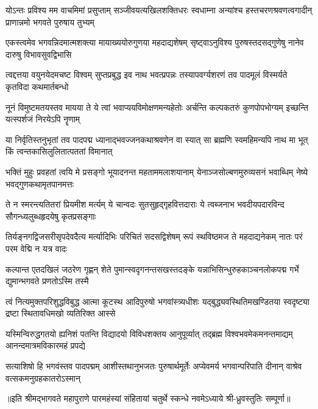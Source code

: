
\fourlineindentedshloka
{योऽन्तः प्रविश्य मम वाचमिमां प्रसुप्ताम्}
{सञ्जीवयत्यखिलशक्तिधरः स्वधाम्ना}
{अन्यांश्च हस्तचरणश्रवणत्वगादीन्}
{प्राणान्नमो भगवते पुरुषाय तुभ्यम्}

\fourlineindentedshloka
{एकस्त्वमेव भगवन्निदमात्मशक्त्या}
{मायाख्ययोरुगुणया महदाद्यशेषम्}
{सृष्ट्वाऽनुविश्य पुरुषस्तदसद्गुणेषु}
{नानेव दारुषु विभावसुवद्विभासि}

\fourlineindentedshloka
{त्वद्दत्तया वयुनयेदमचष्ट विश्वम्}
{सुप्तप्रबुद्ध इव नाथ भवत्प्रपन्नः}
{तस्यापवर्ग्यशरणं तव पादमूलं}
{विस्मर्यते कृतविदा कथमार्तबन्धो}

\fourlineindentedshloka
{नूनं विमुष्टमतयस्तव मायया ते}
{ये त्वां भवाप्ययविमोक्षणमन्यहेतोः}
{अर्चन्ति कल्पकतरुं कुणपोपभोग्यम्}
{इच्छन्ति यत्स्पर्शजं निरयेऽपि नॄणाम्}

\fourlineindentedshloka
{या निर्वृतिस्तनुभृतां तव पादपद्म}
{ध्यानाद्भवज्जनकथाश्रवणेन वा स्यात्}
{सा ब्रह्मणि स्वमहिमन्यपि नाथ मा भूत्}
{किं त्वन्तकासिलुलितात्पततां विमानात्}

\fourlineindentedshloka
{भक्तिं मुहुः प्रवहतां त्वयि मे प्रसङ्गो}
{भूयादनन्त महताममलाशयानाम्}
{येनाञ्जसोल्बणमुरुव्यसनं भवाब्धिम्}
{नेष्ये भवद्गुणकथामृतपानमत्तः}

\fourlineindentedshloka
{ते न स्मरन्त्यतितरां प्रियमीश मर्त्यम्}
{ये चान्वदः सुतसुहृद्गृहवित्तदाराः}
{ये त्वब्जनाभ भवदीयपदारविन्द}
{सौगन्ध्यलुब्धहृदयेषु कृतप्रसङ्गाः}

\fourlineindentedshloka
{तिर्यङ्नगद्विजसरीसृपदेवदैत्य}
{मर्त्यादिभिः परिचितं सदसद्विशेषम्}
{रूपं स्थविष्ठमज ते महदाद्यनेकम्}
{नातः परं परम वेद्मि न यत्र वादः}

\fourlineindentedshloka
{कल्पान्त एतदखिलं जठरेण गृह्णन्}
{शेते पुमान्स्वदृगनन्तसखस्तदङ्के}
{यन्नाभिसिन्धुरुहकाञ्चनलोकपद्म}
{गर्भे द्युमान्भगवते प्रणतोऽस्मि तस्मै}

\fourlineindentedshloka
{त्वं नित्यमुक्तपरिशुद्धविबुद्ध आत्मा}
{कूटस्थ आदिपुरुषो भगवांस्त्र्यधीशः}
{यद्बुद्ध्यवस्थितिमखण्डितया स्वदृष्ट्या}
{द्रष्टा स्थितावधिमखो व्यतिरिक्त आस्से}

\fourlineindentedshloka
{यस्मिन्विरुद्धगतयो ह्यनिशं पतन्ति}
{विद्यादयो विविधशक्तय आनुपूर्व्यात्}
{तद्ब्रह्म विश्वभवमेकमनन्तमाद्यम्}
{आनन्दमात्रमविकारमहं प्रपद्ये}

\fourlineindentedshloka
{सत्याशिषो हि भगवंस्तव पादपद्मम्}
{आशीस्तथानुभजतः पुरुषार्थमूर्तेः}
{अप्येवमर्य भगवान्परिपाति दीनान्}
{वाश्रेव वत्सकमनुग्रहकातरोऽस्मान्}

{॥इति श्रीमद्भागवते महापुराणे पारमहंस्यां संहितायां चतुर्थे स्कन्धे नवमेऽध्याये श्री-ध्रुवस्तुतिः सम्पूर्णा॥}
